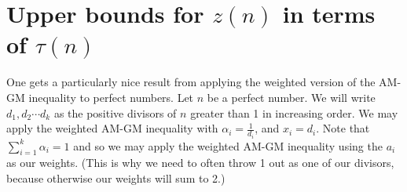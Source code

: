 \documentclass{article}
\newtheorem{lemma}[theorem]{Lemma}
\begin{document}








\section{Upper bounds for $z(n)$ in terms of $\tau(n)$}
One gets a particularly nice result from applying the weighted version of the AM-GM inequality to perfect numbers. Let $n$ be a perfect number. We will write $d_1, d_2 \cdots d_k$ as the positive divisors of $n$ greater than 1 in increasing order. We may apply the weighted AM-GM inequality with $\alpha_i = \frac{1}{d_i}$, and $x_i =d_i$.  Note that $\sum_{i=1}^k \alpha_i=1$ and so we may apply the weighted AM-GM inequality using the $a_i$ as our weights. (This is why we need to often throw 1 out as one of our divisors, because otherwise our weights will sum to 2.)
\end{document}
